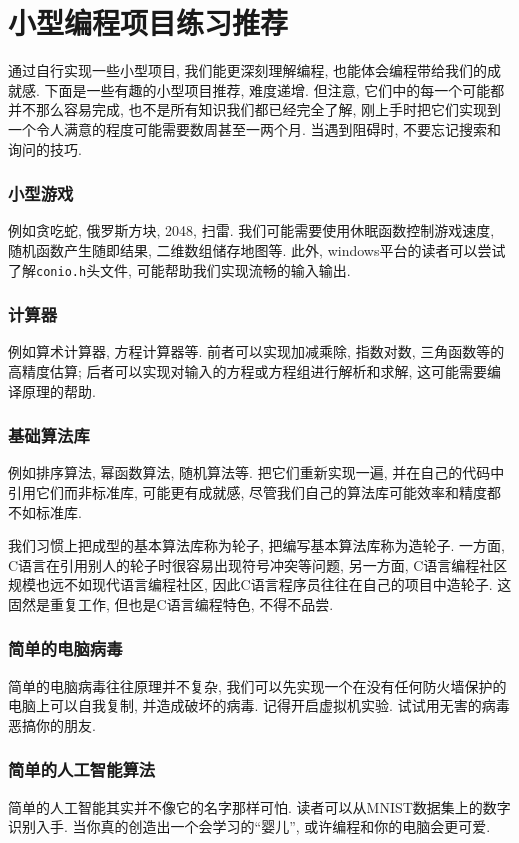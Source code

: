 \chapter{小型编程项目练习推荐} \label{小型编程项目练习推荐}
    通过自行实现一些小型项目, 我们能更深刻理解编程, 也能体会编程带给我们的成就感. 下面是一些有趣的小型项目推荐, 难度递增. 但注意, 它们中的每一个可能都并不那么容易完成, 也不是所有知识我们都已经完全了解, 刚上手时把它们实现到一个令人满意的程度可能需要数周甚至一两个月. 当遇到阻碍时, 不要忘记搜索和询问的技巧.

    \subsection*{小型游戏}
        例如贪吃蛇, 俄罗斯方块, 2048, 扫雷. 我们可能需要使用休眠函数控制游戏速度, 随机函数产生随即结果, 二维数组储存地图等. 此外, windows平台的读者可以尝试了解\texttt{conio.h}头文件, 可能帮助我们实现流畅的输入输出. 

    \subsection*{计算器}
        例如算术计算器, 方程计算器等. 前者可以实现加减乘除, 指数对数, 三角函数等的高精度估算; 后者可以实现对输入的方程或方程组进行解析和求解, 这可能需要编译原理的帮助.

    \subsection*{基础算法库}
        例如排序算法, 幂函数算法, 随机算法等. 把它们重新实现一遍, 并在自己的代码中引用它们而非标准库, 可能更有成就感, 尽管我们自己的算法库可能效率和精度都不如标准库.

        我们习惯上把成型的基本算法库称为轮子, 把编写基本算法库称为造轮子. 一方面, C语言在引用别人的轮子时很容易出现符号冲突等问题, 另一方面, C语言编程社区规模也远不如现代语言编程社区, 因此C语言程序员往往在自己的项目中造轮子. 这固然是重复工作, 但也是C语言编程特色, 不得不品尝.

    \subsection*{简单的电脑病毒}
        简单的电脑病毒往往原理并不复杂, 我们可以先实现一个在没有任何防火墙保护的电脑上可以自我复制, 并造成破坏的病毒. 记得开启虚拟机实验. 试试用无害的病毒恶搞你的朋友.
    
    \subsection*{简单的人工智能算法}
        简单的人工智能其实并不像它的名字那样可怕. 读者可以从MNIST数据集上的数字识别入手. 当你真的创造出一个会学习的``婴儿'', 或许编程和你的电脑会更可爱.